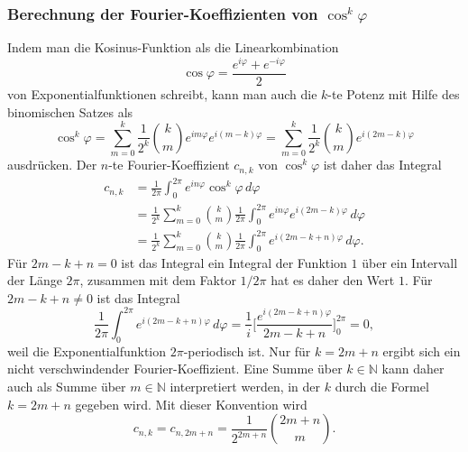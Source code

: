\subsubsection{Berechnung der Fourier-Koeffizienten von $\cos^k\varphi$}
Indem man die Kosinus-Funktion als die Linearkombination
\[
\cos\varphi
=
\frac{e^{i\varphi}+e^{-i\varphi}}2
\]
von Exponentialfunktionen schreibt, kann man auch die $k$-te Potenz 
mit Hilfe des binomischen Satzes als
%
\[
\cos^k\varphi
=
\sum_{m=0}^k
\frac{1}{2^k}
\binom{k}{m}
e^{im\varphi}e^{i(m-k)\varphi}
=
\sum_{m=0}^k
\frac{1}{2^k}
\binom{k}{m}
e^{i(2m-k)\varphi}
\]
ausdrücken.
Der $n$-te Fourier-Koeffizient $c_{n,k}$ von $\cos^k\varphi$ ist daher
das Integral
\begin{align*}
c_{n,k}
&=
\frac{1}{2\pi}
\int_0^{2\pi}
e^{in\varphi}\cos^k\varphi\,d\varphi
\\
&=
\frac{1}{2^k}
\sum_{m=0}^k
\binom{k}{m}
\frac{1}{2\pi}
\int_0^{2\pi}
e^{in\varphi}e^{i(2m-k)\varphi}
\,d\varphi
\\
&=
\frac{1}{2^k}
\sum_{m=0}^k
\binom{k}{m}
\frac{1}{2\pi}
\int_0^{2\pi}
e^{i(2m-k+n)\varphi}
\,d\varphi.
\end{align*}
Für $2m-k+n=0$ ist das Integral ein Integral der Funktion $1$ über
ein Intervall der Länge $2\pi$, zusammen mit dem Faktor $1/2\pi$ hat
es daher den Wert $1$.
Für $2m-k+n\ne 0$ ist das Integral 
\[
\frac{1}{2\pi}
\int_0^{2\pi}
e^{i(2m-k+n)\varphi}
\,d\varphi
=
\frac{1}{i}
\biggl[
\frac{e^{i(2m-k+n)\varphi}}{2m-k+n}
\biggr]_0^{2\pi}
=
0,
\]
weil die Exponentialfunktion $2\pi$-periodisch ist.
Nur für $k=2m+n$ ergibt sich ein nicht verschwindender
Fourier-Koeffizient.
Eine Summe über $k\in\mathbb{N}$ kann daher auch als Summe über
$m\in\mathbb{N}$ interpretiert werden, in der $k$ durch die Formel
$k=2m+n$ gegeben wird.
Mit dieser Konvention wird
\begin{equation}
c_{n,k}
=
c_{n,2m+n}
=
\frac{1}{2^{2m+n}}
\binom{2m+n}{m}.
\label{buch:fourier:eqn:cnk}
\end{equation}

%
%
